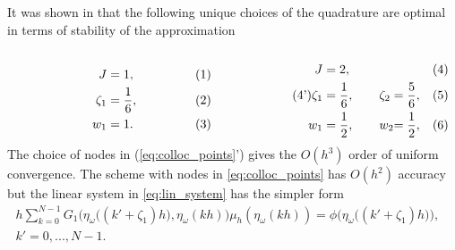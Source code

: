It was shown in \cite{Sloan1992} that the following unique choices of the quadrature  %
are optimal in terms of stability of the approximation
\begin{equation*}
\begin{minipage}{.45\linewidth}
	\begin{align}\label{eq:colloc_points}
		\nonumber
		J &= 1,  
		\\
		\zeta_1 &= \frac{1}{6},
		\\ \nonumber
		w_1     &= 1.
	\end{align}
\end{minipage}
\begin{minipage}{.1\linewidth}
\qquad
\end{minipage}
\begin{minipage}{.45\linewidth}
    \begin{alignat*}{2}
		\nonumber
		J &= 2, & 
		\\ \tag{\theequation'}
		\zeta_1 &= \frac{1}{6}, \qquad \zeta_2 &= \frac{5}{6},
		\\ \nonumber
		w_1     &= \frac{1}{2}, \qquad     w_2 &= \frac{1}{2},
	\end{alignat*}
\end{minipage}
\end{equation*}
The choice of nodes in (\ref{eq:colloc_points}') gives the $O(h^3)$ order of uniform convergence.
The scheme with nodes in \eqref{eq:colloc_points} has $O(h^2)$ accuracy but the linear system in \eqref{eq:lin_system} has the simpler form
\begin{align} \label{eq:lin_system_2}
	h\sum_{k=0}^{N-1} G_1\Big( \eta_{\omega}\big((k'+\zeta_1)h\big), \eta_{\omega}(kh) \Big) \mu_h(\eta_{\omega}(kh)) = \phi \big( \eta_{\omega}\big((k' + \zeta_1)h \big)\big),&
	\\ \nonumber
	k' = 0,...,N-1.&
\end{align}

